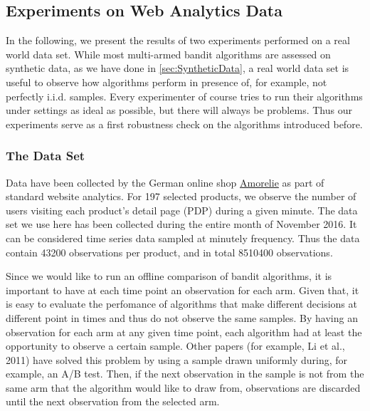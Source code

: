 \documentclass[11pt,]{article}
\begin{document}
\subsection{\texorpdfstring{Experiments on Web Analytics Data
\label{sec:RealData}}{Experiments on Web Analytics Data }}\label{experiments-on-web-analytics-data}

In the following, we present the results of two experiments performed on
a real world data set. While most multi-armed bandit algorithms are
assessed on synthetic data, as we have done in
\autoref{sec:SyntheticData}, a real world data set is useful to observe
how algorithms perform in presence of, for example, not perfectly i.i.d.
samples. Every experimenter of course tries to run their algorithms
under settings as ideal as possible, but there will always be problems.
Thus our experiments serve as a first robustness check on the algorithms
introduced before.

\subsubsection{The Data Set}\label{the-data-set}

Data have been collected by the German online shop
\href{https://amorelie.de}{Amorelie} as part of standard website
analytics. For 197 selected products, we observe the number of users
visiting each product's detail page (PDP) during a given minute. The
data set we use here has been collected during the entire month of
November 2016. It can be considered time series data sampled at minutely
frequency. Thus the data contain 43200 observations per product, and in
total 8510400 observations.

Since we would like to run an offline comparison of bandit algorithms,
it is important to have at each time point an observation for each arm.
Given that, it is easy to evaluate the perfomance of algorithms that
make different decisions at different point in times and thus do not
observe the same samples. By having an observation for each arm at any
given time point, each algorithm had at least the opportunity to observe
a certain sample. Other papers (for example, Li et al., 2011) have
solved this problem by using a sample drawn uniformly during, for
example, an A/B test. Then, if the next observation in the sample is not
from the same arm that the algorithm would like to draw from,
observations are discarded until the next observation from the selected
arm.
\end{document}
